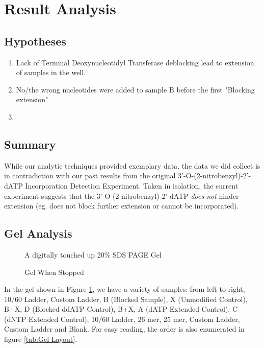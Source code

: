 \documentclass[letterpaper]{article}
\newcommand{\tdt}{Terminal Deoxynucleotidyl Transferase}
\newcommand{\BdATP}{3'-O-(2-nitrobenzyl)-2'-dATP}
\begin{document}
\section{Result Analysis}

\subsection{Hypotheses}
\begin{enumerate}
\item{Lack of \tdt{} deblocking lead to extension of samples in the well.}
\item{No/the wrong nucleotides were added to sample B before the first "Blocking extension"}
\item{}
\end{enumerate}

\subsection{Summary}
While our analytic techniques provided exemplary data, the data we did collect is in contradiction with our past results from the original \BdATP{} Incorporation Detection Experiment. Taken in isolation, the current experiment suggests that the \BdATP{} \textit{does not} hinder extension (eg. does not block further extension or cannot be incorporated).
\subsection{Gel Analysis}

\begin{figure}[ht]
\label{mainGel}
\begin{center}
\caption{A digitally touched up 20\% SDS PAGE Gel}
\end{center}
\end{figure}

\begin{figure}
\centering
\caption{Gel When Stopped}
\label{endCondition}
\end{figure}


In the gel shown in Figure \ref{mainGel}, we have a variety of samples: from left to right, 10/60 Ladder, Custom Ladder, B (Blocked Sample), X (Unmodified Control), B+X, D (Blocked ddATP Control), B+X, A (dATP Extended Control), C (dNTP Extended Control), 10/60 Ladder, 26 mer, 25 mer, Custom Ladder, Custom Ladder and Blank. For easy reading, the order is also enumerated in figure \ref{tab:Gel Layout}.\\
\end{document}
